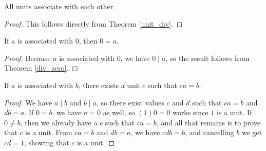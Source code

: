\documentclass[../../math.tex]{subfiles}
\begin{document}
\begin{theorem} \label{unit_associates}
    All units associate with each other.
\end{theorem}
\begin{proof}
    This follows directly from Theorem \ref{unit_div}.
\end{proof}

\begin{theorem} \label{associates_zero}
    If $a$ is associated with $0$, then $0 = a$.
\end{theorem}
\begin{proof}
    Because $a$ is associated with $0$, we have $0 \mid a$, so the result
    follows from Theorem \ref{div_zero}.
\end{proof}

\begin{theorem} \label{associates_unit}
    If $a$ is associated with $b$, there exists a unit $c$ such that $ca = b$.
\end{theorem}
\begin{proof}
    We have $a \mid b$ and $b \mid a$, so there exist values $c$ and $d$ such
    that $ca = b$ and $db = a$.  If $0 = b$, we have $a = 0$ as well, so $(1)0 =
    0$ works since $1$ is a unit.  If $0 \neq b$, then we already have a $c$
    such that $ca = b$, and all that remains is to prove that $c$ is a unit.
    From $ca = b$ and $db = a$, we have $cdb = b$, and cancelling $b$ we get $cd
    = 1$, showing that $c$ is a unit.
\end{proof}
\end{document}

